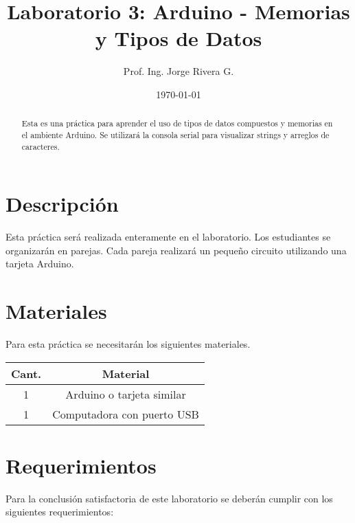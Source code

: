 \documentclass[12pt,letterpaper]{IEEEtran}
\title{Laboratorio 3: Arduino - Memorias\\ y Tipos de Datos}
\author{Prof. Ing. Jorge Rivera G.}
\date{\today}
\begin{document}

\renewcommand{\leftmark}{UNIVERSIDAD LATINA DE COSTA RICA -- IEC-650 LABORATORIO DE SISTEMAS DIGITALES}

\maketitle


\begin{abstract}
Esta es una práctica para aprender el uso de tipos de datos compuestos y memorias en el ambiente Arduino. Se utilizará la consola serial para visualizar strings y arreglos de caracteres.
\end{abstract}

\section{Descripción}

Esta práctica será realizada enteramente en el laboratorio. Los estudiantes se organizarán en parejas. Cada pareja realizará un pequeño circuito utilizando una tarjeta Arduino.

\section{Materiales}

Para esta práctica se necesitarán los siguientes materiales.

\begin{center}
\begin{tabular}{c|c}\hline
	Cant. & \hspace{2cm}Material\hspace{2cm} \\\hline\hline
	1 	& Arduino o tarjeta similar		\\\hline
	1	& Computadora con puerto USB  	\\\hline	
\end{tabular}
\end{center}

\section{Requerimientos}

Para la conclusión satisfactoria de este laboratorio se deberán cumplir con los siguientes requerimientos:
\end{document}
